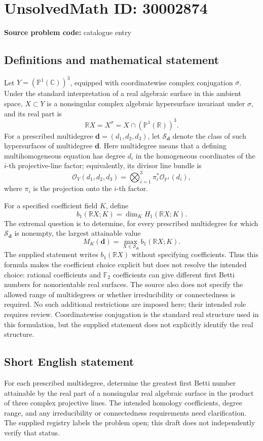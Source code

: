 \documentclass[11pt]{article}
\newcommand{\R}{\mathbb{R}}
\newcommand{\C}{\mathbb{C}}
\begin{document}
\section*{UnsolvedMath ID: 30002874}
\textbf{Source problem code:} catalogue entry
\subsection{Definitions and mathematical statement}
Let \(Y=(\mathbb{P}^{1}(\C))^{3}\), equipped with coordinatewise complex conjugation \(\sigma\). Under the standard interpretation of a real algebraic surface in this ambient space, \(X\subset Y\) is a nonsingular complex algebraic hypersurface invariant under \(\sigma\), and its real part is
\[
\mathbb{R}X=X^{\sigma}=X\cap(\mathbb{P}^{1}(\R))^{3}.
\]
For a prescribed multidegree \(\mathbf d=(d_1,d_2,d_3)\), let \(\mathcal S_{\mathbf d}\) denote the class of such hypersurfaces of multidegree \(\mathbf d\). Here multidegree means that a defining multihomogeneous equation has degree \(d_i\) in the homogeneous coordinates of the \(i\)-th projective-line factor; equivalently, its divisor line bundle is
\[
\mathcal O_Y(d_1,d_2,d_3)=\bigotimes_{i=1}^{3}\pi_i^{*}\mathcal O_{\mathbb{P}^{1}}(d_i),
\]
where \(\pi_i\) is the projection onto the \(i\)-th factor.

For a specified coefficient field \(K\), define
\[
b_1(\mathbb{R}X;K)=\dim_K H_1(\mathbb{R}X;K).
\]
The extremal question is to determine, for every prescribed multidegree for which \(\mathcal S_{\mathbf d}\) is nonempty, the largest attainable value
\[
M_K(\mathbf d)=\max_{X\in\mathcal S_{\mathbf d}} b_1(\mathbb{R}X;K).
\]
The supplied statement writes \(b_1(\mathbb{R}X)\) without specifying coefficients. Thus this formula makes the coefficient choice explicit but does not resolve the intended choice: rational coefficients and \(\mathbb F_2\) coefficients can give different first Betti numbers for nonorientable real surfaces. The source also does not specify the allowed range of multidegrees or whether irreducibility or connectedness is required. No such additional restrictions are imposed here; their intended role requires review. Coordinatewise conjugation is the standard real structure used in this formulation, but the supplied statement does not explicitly identify the real structure.
\subsection{Short English statement}
For each prescribed multidegree, determine the greatest first Betti number attainable by the real part of a nonsingular real algebraic surface in the product of three complex projective lines. The intended homology coefficients, degree range, and any irreducibility or connectedness requirements need clarification. The supplied registry labels the problem open; this draft does not independently verify that status.
\end{document}

